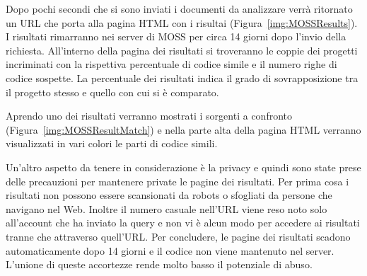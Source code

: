			Dopo pochi secondi che si sono inviati i documenti da analizzare verrà ritornato un URL che porta alla pagina HTML con i risultai (Figura~\ref{img:MOSSResults}). I risultati rimarranno nei server di MOSS per circa 14 giorni dopo l'invio della richiesta. All'interno della pagina dei risultati si troveranno le coppie dei progetti incriminati con la rispettiva percentuale di codice simile e il numero righe di codice sospette. La percentuale dei risultati indica il grado di sovrapposizione tra il progetto stesso e quello con cui si è comparato.
			
			\begin{center}
				\label{img:MOSSResults}
			\end{center}
			
			Aprendo uno dei risultati verranno mostrati i sorgenti a confronto (Figura~\ref{img:MOSSResultMatch}) e nella parte alta della pagina HTML verranno visualizzati in vari colori le parti di codice simili.
			\begin{center}
				\label{img:MOSSResultMatch}
			\end{center}
			
			Un'altro aspetto da tenere in considerazione è la privacy e quindi sono state prese delle precauzioni per mantenere private le pagine dei risultati. Per prima cosa i risultati non possono essere scansionati da robots o sfogliati da persone che navigano nel Web. Inoltre il numero casuale nell'URL viene reso noto solo all'account che ha inviato la query e non vi è alcun modo per accedere ai risultati tranne che attraverso quell'URL. Per concludere, le pagine dei risultati scadono automaticamente dopo 14 giorni e il codice non viene mantenuto nel server. L'unione di queste accortezze rende molto basso il potenziale di abuso.